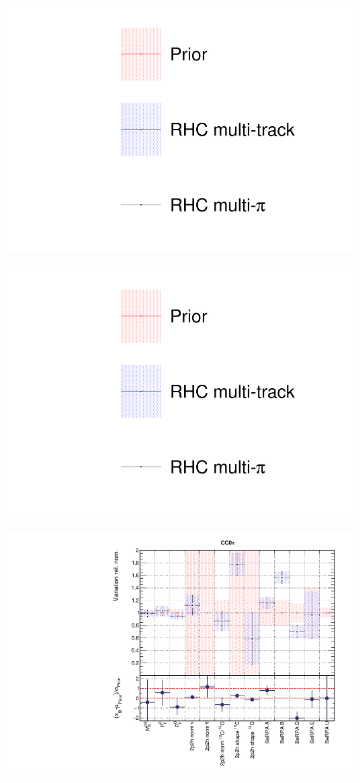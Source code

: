 \begin{figure}[t]
\centering
\begin{subfigure}{0.3\textwidth}
  \centering
  \includegraphics[width=1.0\linewidth, trim={5mm  130mm 0mm 10mm}, clip]{figs/rhcmpdat248_leg}	
\end{subfigure}
\begin{subfigure}{0.3\textwidth}
  \centering
  \includegraphics[width=1.0\linewidth, trim={5mm  0mm 0mm 70mm}, clip]{figs/rhcmpdat248_leg}	
\end{subfigure}
\begin{subfigure}{0.49\textwidth}
  \centering
  \includegraphics[width=0.95\linewidth]{figs/rhcmpdatxsec248_1}

\end{subfigure}
\end{figure}
